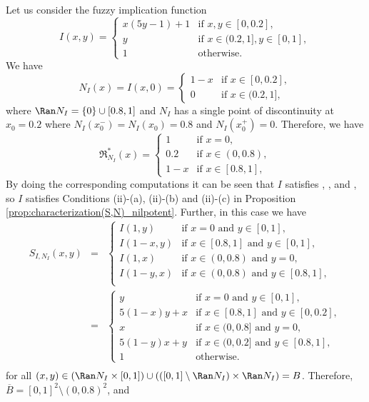 \begin{example}
Let us consider the fuzzy implication function
$$
I(x,y) =
\left\{ \begin{array}{ll}
	x(5y-1)+1 &   \text{if }   x,y \in [0,0.2], \\
	y &   \text{if }   x \in (0.2,1], y \in [0,1],\\
	1 & \text{otherwise.}
\end{array} \right.
$$
We have
$$
N_{I}(x) = I(x,0) =
\left\{ \begin{array}{ll}
	1-x &   \text{if }   x \in [0,0.2], \\
	0 &   \text{if }   x \in (0.2,1],
\end{array} \right.
$$
where $\Ran N_{I} = \{0\} \cup [0.8,1]$ and $N_{I}$ has a single point of discontinuity at $x_0 =0.2$ where $N_{I}(x_0^{-})=N_I(x_0)=0.8$ and $N_{I}(x_0^{+})=0$. Therefore, we have
$$
\mathfrak{R}^*_{N_{I}}(x) =
\left\{ \begin{array}{ll}
	1 &   \text{if }   x = 0 , \\
	0.2 &   \text{if }   x \in (0,0.8), \\
	1-x &   \text{if }   x \in [0.8,1],
\end{array} \right.
$$
By doing the corresponding computations it can be seen that $I$ satisfies \NP, \EP, \Rone and \Rtwo, so $I$ satisfies Conditions (ii)-(a), (ii)-(b) and (ii)-(c) in Proposition \ref{prop:characterization(S,N)_nilpotent}.  Further, in this case we have
\begin{eqnarray*}
	S_{I,N_{I}}(x,y) 
	&=&  
	\left\{ \begin{array}{ll}
		I(1,y) &   \text{if }   x=0 \text{ and } y \in [0,1], \\
		I(1-x,y) &   \text{if }   x \in [0.8,1] \text{ and } y \in [0,1], \\
		I(1,x) &   \text{if }    x \in (0,0.8) \text{ and }  y=0, \\
		I(1-y,x) &   \text{if }    x \in (0,0.8) \text{ and }  y\in [0.8,1], \\
	\end{array} \right. \\
	&=&
	\left\{ \begin{array}{ll}
		y &   \text{if }   x=0 \text{ and } y \in [0,1], \\
		5(1-x)y+x &   \text{if }   x \in [0.8,1] \text{ and } y \in [0,0.2], \\
		x &   \text{if }    x \in (0,0.8] \text{ and }  y=0, \\
		5(1-y)x+y &   \text{if }    x \in (0,0.2] \text{ and }  y\in [0.8,1], \\
		1 & \text{otherwise}.
	\end{array} \right. \\
\end{eqnarray*}
for all $(x,y) \in (\Ran N_{I} \times [0,1]) \cup (([0,1] \setminus \Ran N_{I}) \times \Ran N_{I})=B$. Therefore, $\overline{B}=[0,1]^2 \setminus (0,0.8)^2$, and


\end{example}
